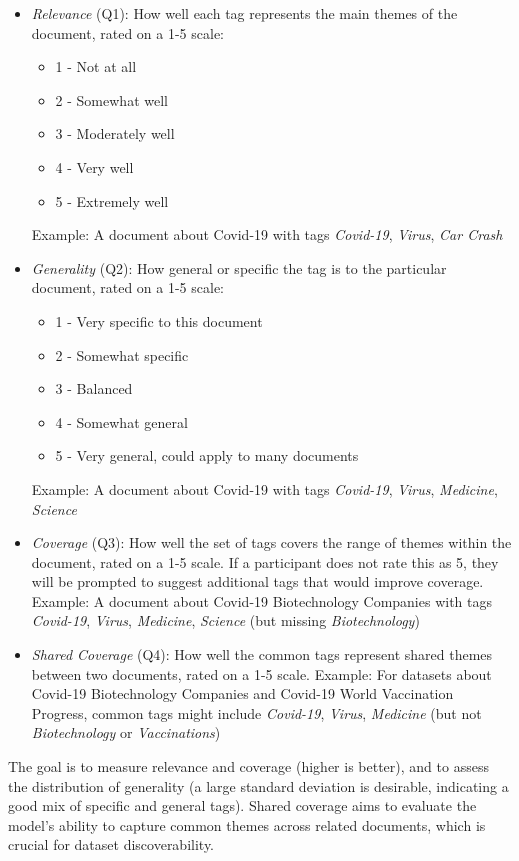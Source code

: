 \begin{itemize}
\item \textit{Relevance} (Q1): How well each tag represents the main themes of the document, rated on a 1-5 scale:
\begin{itemize}
\item 1 - Not at all
\item 2 - Somewhat well
\item 3 - Moderately well
\item 4 - Very well
\item 5 - Extremely well
\end{itemize}
Example: A document about Covid-19 with tags \textit{Covid-19}, \textit{Virus}, \textit{Car Crash}

\item \textit{Generality} (Q2): How general or specific the tag is to the particular document, rated on a 1-5 scale:
\begin{itemize}
\item 1 - Very specific to this document
\item 2 - Somewhat specific
\item 3 - Balanced
\item 4 - Somewhat general
\item 5 - Very general, could apply to many documents
\end{itemize}
Example: A document about Covid-19 with tags \textit{Covid-19}, \textit{Virus}, \textit{Medicine}, \textit{Science}

\item \textit{Coverage} (Q3): How well the set of tags covers the range of themes within the document, rated on a 1-5 scale. If a participant does not rate this as 5, they will be prompted to suggest additional tags that would improve coverage.
Example: A document about Covid-19 Biotechnology Companies with tags \textit{Covid-19}, \textit{Virus}, \textit{Medicine}, \textit{Science} (but missing \textit{Biotechnology})

\item \textit{Shared Coverage} (Q4): How well the common tags represent shared themes between two documents, rated on a 1-5 scale.
Example: For datasets about Covid-19 Biotechnology Companies and Covid-19 World Vaccination Progress, common tags might include \textit{Covid-19}, \textit{Virus}, \textit{Medicine} (but not \textit{Biotechnology} or \textit{Vaccinations})
\end{itemize}

The goal is to measure relevance and coverage (higher is better), and to assess the distribution of generality (a large standard deviation is desirable, indicating a good mix of specific and general tags). Shared coverage aims to evaluate the model's ability to capture common themes across related documents, which is crucial for dataset discoverability.


